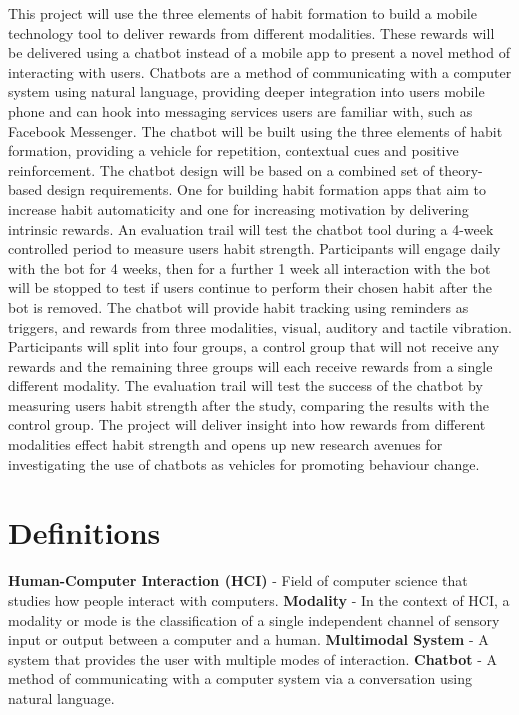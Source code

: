 \newline
This project will use the three elements of habit formation to build a mobile technology tool to deliver rewards from different modalities. These rewards will be delivered using a chatbot instead of a mobile app to present a novel method of interacting with users. Chatbots are a method of communicating with a computer system using natural language, providing deeper integration into users mobile phone and can hook into messaging services users are familiar with, such as Facebook Messenger. The chatbot will be built using the three elements of habit formation, providing a vehicle for repetition, contextual cues and positive reinforcement.\newline
\newline
The chatbot design will be based on a combined set of theory-based design requirements. One for building habit formation apps that aim to increase habit automaticity and one for increasing motivation by delivering intrinsic rewards.\newline
\newline
An evaluation trail will test the chatbot tool during a 4-week controlled period to measure users habit strength. Participants will engage daily with the bot for 4 weeks, then for a further 1 week all interaction with the bot will be stopped to test if users continue to perform their chosen habit after the bot is removed. The chatbot will provide habit tracking using reminders as triggers, and rewards from three modalities, visual, auditory and tactile vibration. Participants will split into four groups, a control group that will not receive any rewards and the remaining three groups will each receive rewards from a single different modality. The evaluation trail will test the success of the chatbot by measuring users habit strength after the study, comparing the results with the control group.\newline
\newline
The project will deliver insight into how rewards from different modalities effect habit strength and opens up new research avenues for investigating the use of chatbots as vehicles for promoting behaviour change.
\newpage

\section*{Definitions}

\textbf{Human-Computer Interaction (HCI)} - Field of computer science that studies how people interact with computers.\newline
\newline
\textbf{Modality} - In the context of HCI, a modality or mode is the classification of a single independent channel of sensory input or output between a computer and a human.\newline
\newline
\textbf{Multimodal System} - A system that provides the user with multiple modes of interaction.\newline
\newline
\textbf{Chatbot} - A method of communicating with a computer system via a conversation using natural language.

\newpage
